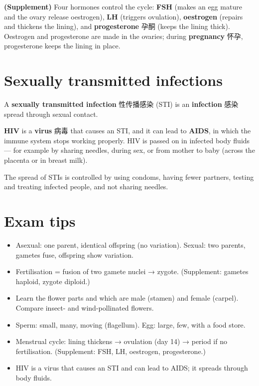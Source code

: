 \documentclass[11pt]{article}
\begin{document}
\textbf{(Supplement)} Four hormones control the cycle: \textbf{FSH} (makes an egg mature and the ovary release oestrogen), \textbf{LH} (triggers ovulation), \textbf{oestrogen} (repairs and thickens the lining), and \textbf{progesterone} 孕酮 (keeps the lining thick). Oestrogen and progesterone are made in the ovaries; during \textbf{pregnancy} 怀孕, progesterone keeps the lining in place.

\section*{Sexually transmitted infections}

A \textbf{sexually transmitted infection} 性传播感染 (STI) is an \textbf{infection} 感染 spread through sexual contact.

\textbf{HIV} is a \textbf{virus} 病毒 that causes an STI, and it can lead to \textbf{AIDS}, in which the immune system stops working properly. HIV is passed on in infected body fluids — for example by sharing needles, during sex, or from mother to baby (across the placenta or in breast milk).

The spread of STIs is controlled by using condoms, having fewer partners, testing and treating infected people, and not sharing needles.

\section*{Exam tips}

\begin{itemize}
\item Asexual: one parent, identical offspring (no variation). Sexual: two parents, gametes fuse, offspring show variation.

\item Fertilisation = fusion of two gamete nuclei → zygote. (Supplement: gametes haploid, zygote diploid.)

\item Learn the flower parts and which are male (stamen) and female (carpel). Compare insect- and wind-pollinated flowers.

\item Sperm: small, many, moving (flagellum). Egg: large, few, with a food store.

\item Menstrual cycle: lining thickens → ovulation (day 14) → period if no fertilisation. (Supplement: FSH, LH, oestrogen, progesterone.)

\item HIV is a virus that causes an STI and can lead to AIDS; it spreads through body fluids.

\end{itemize}
\end{document}
